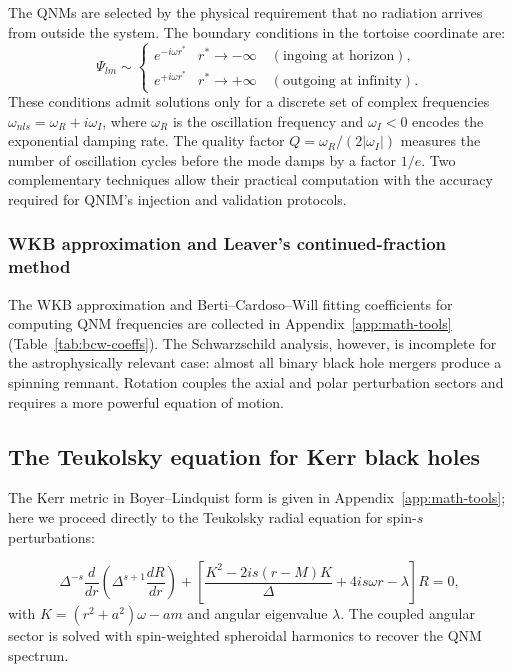 \documentclass[11pt,a4paper, english]{book}
\theoremstyle{plain}
\theoremstyle{definition}
\numberwithin{equation}{chapter}
\numberwithin{figure}{chapter}
\numberwithin{table}{chapter}
\begin{document}
The QNMs are selected by the physical requirement that no radiation arrives
from outside the system.  The boundary conditions in the tortoise coordinate
are:
\begin{equation}
  \label{eq:qnm_bc}
  \Psi_{lm} \sim
  \begin{cases}
    e^{-i\omega r^*} & r^* \to -\infty \quad (\text{ingoing at horizon}),\\
    e^{+i\omega r^*} & r^* \to +\infty \quad (\text{outgoing at infinity}).
  \end{cases}
\end{equation}
These conditions admit solutions only for a discrete set of complex
frequencies $\omega_{nls} = \omega_R + i\omega_I$, where $\omega_R$ is the
oscillation frequency and $\omega_I < 0$ encodes the exponential damping
rate.  The quality factor $Q = \omega_R / (2|\omega_I|)$ measures the number
of oscillation cycles before the mode damps by a factor $1/e$. Two
complementary techniques allow their practical computation with the
accuracy required for QNIM's injection and validation protocols.

\subsubsection{WKB approximation and Leaver's continued-fraction method}

The WKB approximation and Berti--Cardoso--Will fitting 
coefficients for computing QNM frequencies are collected in 
Appendix~\ref{app:math-tools} (Table~\ref{tab:bcw-coeffs}).
The Schwarzschild analysis, however, is incomplete for the astrophysically
relevant case: almost all binary black hole mergers produce a spinning remnant.
Rotation couples the axial and polar perturbation sectors and requires a more
powerful equation of motion.

\subsection{The Teukolsky equation for Kerr black holes}
\label{subsec:teukolsky}

The Kerr metric in Boyer--Lindquist form is given in 
Appendix~\ref{app:math-tools}; here we proceed directly 
to the Teukolsky radial equation for spin-$s$ perturbations:

\begin{equation}
  \label{eq:teukolsky}
  \Delta^{-s}\frac{d}{dr}\!\left(\Delta^{s+1}\frac{dR}{dr}\right)
  + \left[\frac{K^2 - 2is(r-M)K}{\Delta}
    + 4is\omega r - \lambda\right]R = 0,
\end{equation}
with $K = (r^2+a^2)\omega - am$ and angular eigenvalue $\lambda$. The coupled angular sector is solved with spin-weighted spheroidal harmonics to recover the QNM spectrum.
\end{document}
